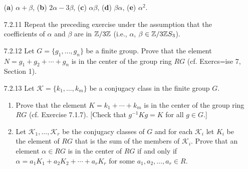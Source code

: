 \begin{enumerate}
                  (\textbf{a}) $\alpha + \beta$, \quad
                  (\textbf{b}) $2\alpha - 3\beta$, \quad
                  (\textbf{c}) $\alpha\beta$, \quad
                  (\textbf{d}) $\beta\alpha$,
                  (\textbf{e}) $\alpha^2$.
   \item[7.2.11]  Repeat the preceding exercise under the assumption that the
                  coefficients of $\alpha$ and $\beta$ are in $\mathbb{Z}/3\mathbb{Z}$ (i.e.,
                  $\alpha$, $\beta \in \mathbb{Z}/3\mathbb{Z} S_3$).
   \item[7.2.12]  Let $G = \{g_1, \ldots, g_n\}$ be a finite group. Prove that
                  the element $N = g_1 + g_2 + \cdots + g_n$ is in the center of
                  the group ring $RG$ (cf. Exercs=ise 7, Section 1).
   \item[7.2.13]  Let $\mathcal{K} = \{k_1, \ldots, k_m\}$ be a conjugacy class
                  in the finite group $G$.
                  \begin{enumerate}
                     \item Prove that the element $K = k_1 + \cdots + k_m$ is in
                           the center of the group ring $RG$
                           (cf. Exercise 7.1.7). [Check that $g^{-1}Kg = K$ for
                           all $g \in G$.]
                     \item Let $\mathcal{K}_1, \ldots, \mathcal{K}_r$ be the
                           conjugacy classes of $G$ and for each $\mathcal{K}_i$
                           let $K_i$ be the element of $RG$ that is the sum of
                           the members of $\mathcal{K}_i$. Prove that an element
                           $\alpha \in RG$ is in the center of $RG$ if and only
                           if $\alpha = a_1K_1 + a_2K_2 + \cdots + a_rK_r$ for
                           some $a_1, a_2, \ldots, a_r \in R$.
                  \end{enumerate}
\end{enumerate}

